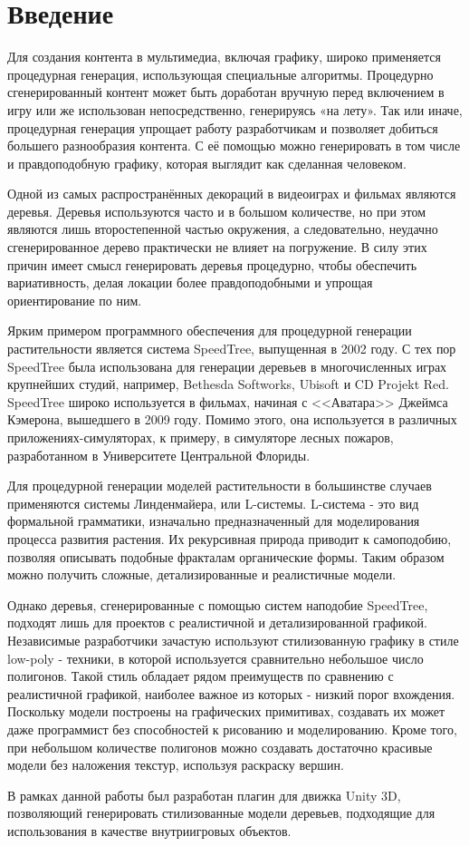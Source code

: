 \chapter{Введение}

Для создания контента в мультимедиа, включая графику, широко
применяется процедурная генерация, использующая специальные
алгоритмы. Процедурно сгенерированный контент может быть
доработан вручную перед включением в игру или же использован
непосредственно, генерируясь «на лету». Так или иначе, процедурная
генерация упрощает работу разработчикам и позволяет добиться
большего разнообразия контента. С её помощью можно генерировать
в том числе и правдоподобную графику, которая выглядит как 
сделанная человеком.

Одной из самых распространённых декораций в видеоиграх и фильмах
являются деревья. Деревья используются часто и в большом количестве, но при этом являются лишь второстепенной частью окружения, а следовательно, неудачно сгенерированное дерево практически не влияет на погружение. В силу этих причин имеет смысл генерировать деревья процедурно, чтобы
обеспечить вариативность, делая локации более правдоподобными и
упрощая ориентирование по ним. 

Ярким примером программного обеспечения для процедурной генерации растительности является система SpeedTree, выпущенная в 2002 году. С тех пор SpeedTree была использована для генерации деревьев в многочисленных играх крупнейших студий, например, Bethesda Softworks, Ubisoft и CD Projekt Red. SpeedTree широко используется в фильмах, начиная с <<Аватара>> Джеймса Кэмерона, вышедшего в 2009 году. Помимо этого, она используется в различных приложениях-симуляторах, к примеру, в симуляторе лесных пожаров, разработанном в Университете Центральной Флориды.

Для процедурной генерации моделей растительности в большинстве случаев применяются системы Линденмайера, или L-системы. L-система - это вид формальной грамматики, изначально предназначенный для моделирования процесса развития растения. Их рекурсивная природа приводит к самоподобию, позволяя описывать подобные фракталам органические формы. Таким образом можно получить сложные, детализированные и реалистичные модели.

Однако деревья, сгенерированные с помощью систем наподобие SpeedTree, подходят лишь для проектов с реалистичной и детализированной графикой. Независимые разработчики зачастую используют стилизованную графику в стиле low-poly - техники, в которой используется сравнительно небольшое число полигонов. Такой стиль обладает рядом преимуществ по сравнению с реалистичной графикой, наиболее важное из которых - низкий порог вхождения. Поскольку модели построены на графических примитивах, создавать их может даже программист без способностей к рисованию и моделированию. Кроме того, при небольшом количестве полигонов можно создавать достаточно красивые модели без наложения текстур, используя раскраску вершин.

В рамках данной работы был разработан плагин для движка Unity 3D, позволяющий генерировать стилизованные модели деревьев, подходящие для использования в качестве внутриигровых объектов. 
 
\newpage
